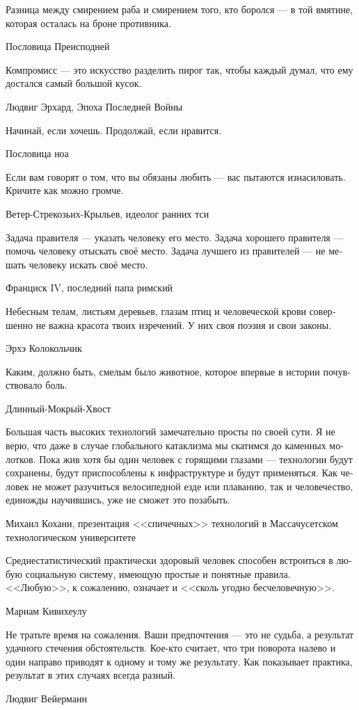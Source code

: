 \documentclass[a4paper,12pt,fleqn]{book}\usepackage{polyglossia}\setdefaultlanguage[babelshorthands=true]{russian}\setotherlanguage{english}\defaultfontfeatures{Ligatures=TeX,Mapping=tex-text}\usepackage{xcolor}\newcommand{\ml}[3]{#2}
\begin{document}
{\epigraph{
\ml{$0$}
{Разница между смирением раба и смирением того, кто боролся --- в той вмятине, которая осталась на броне противника.}
{Between humility of slave and humility of the one who fought lies a dent in the enemy's armour.}
}{Пословица Преисподней}

\epigraph
{Компромисс --- это искусство разделить пирог так, чтобы каждый думал, что ему достался самый большой кусок.}
{Людвиг Эрхард, Эпоха Последней Войны}

\epigraph{
\ml{$0$}
{Начинай, если хочешь.}
{Begin if you want.}
\ml{$0$}
{Продолжай, если нравится.}
{Continue if you like.}
}{Пословица ноа}

\epigraph
{Если вам говорят о том, что вы обязаны любить --- вас пытаются изнасиловать.
Кричите как можно громче.}
{Ветер-Стрекозьих-Крыльев, идеолог ранних тси}

\epigraph
{Задача правителя --- указать человеку его место.
Задача хорошего правителя --- помочь человеку отыскать своё место.
Задача лучшего из правителей --- не мешать человеку искать своё место.}
{Франциск IV, последний папа римский}

\epigraph
{Небесным телам, листьям деревьев, глазам птиц и человеческой крови совершенно не важна красота твоих изречений.
У них своя поэзия и свои законы.}
{Эрхэ Колокольчик}

\epigraph
{Каким, должно быть, смелым было животное, которое впервые в истории почувствовало боль.}
{Длинный-Мокрый-Хвост}

\epigraph
{Большая часть высоких технологий замечательно просты по своей сути.
Я не верю, что даже в случае глобального катаклизма мы скатимся до каменных молотков.
Пока жив хотя бы один человек с горящими глазами --- технологии будут сохранены, будут приспособлены к инфраструктуре и будут применяться.
Как человек не может разучиться велосипедной езде или плаванию, так и человечество, единожды научившись, уже не сможет это позабыть.}
{Михаил Кохани, презентация <<спичечных>> технологий в Массачусетском технологическом университете}

\epigraph
{Среднестатистический практически здоровый человек способен встроиться в любую социальную систему, имеющую простые и понятные правила.
<<Любую>>, к сожалению, означает и <<сколь угодно бесчеловечную>>.}
{Мариам Кивихеулу}

\epigraph
{Не тратьте время на сожаления.
Ваши предпочтения --- это не судьба, а результат удачного стечения обстоятельств.
Кое-кто считает, что три поворота налево и один направо приводят к одному и тому же результату.
Как показывает практика, результат в этих случаях всегда разный.}
{Людвиг Вейерманн}

}
\end{document}
